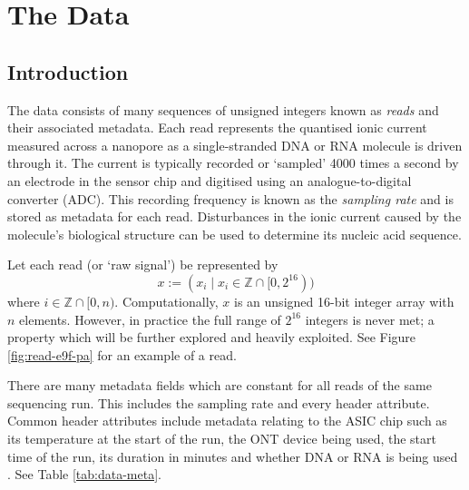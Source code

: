 \chapter{The Data} \label{chap:data}

\section{Introduction}




The data consists of many sequences of unsigned integers known as \textit{reads} and their associated metadata. Each read represents the quantised ionic current measured across a nanopore as a single-stranded DNA or RNA molecule is driven through it. The current is typically recorded or `sampled' 4000 times a second by an electrode in the sensor chip and digitised using an analogue-to-digital converter (ADC). This recording frequency is known as the \textit{sampling rate} and is stored as metadata for each read. Disturbances in the ionic current caused by the molecule's biological structure can be used to determine its nucleic acid sequence.

Let each read (or `raw signal') be represented by
\[ x := (x_i\mid x_i \in \mathbb{Z} \cap [0, 2^{16})) \]
where $i\in \mathbb{Z}\cap [0, n)$. Computationally, $x$ is an unsigned 16-bit integer array with $n$ elements. However, in practice the full range of $2^{16}$ integers is never met; a property which will be further explored and heavily exploited. See Figure \ref{fig:read-e9f-pa} for an example of a read.

There are many metadata fields which are constant for all reads of the same sequencing run. This includes the sampling rate and every header attribute. Common header attributes include metadata relating to the ASIC chip such as its temperature at the start of the run, the ONT device being used, the start time of the run, its duration in minutes and whether DNA or RNA is being used \cite{slow5-spec}. See Table \ref{tab:data-meta}.




